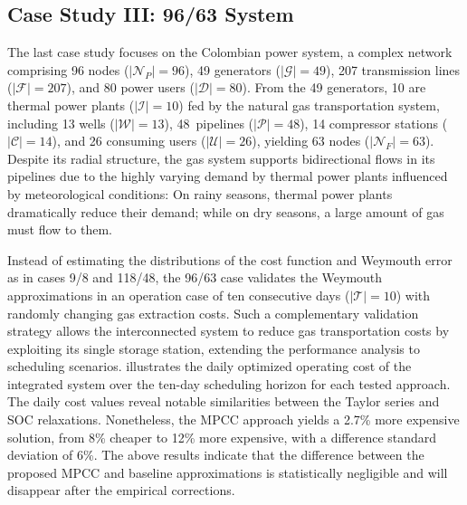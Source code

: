 \subsection{Case Study III: 96/63 System}

The last case study focuses on the Colombian power system, a complex network comprising 96 nodes ($\left | \mathcal{N}_P \right | = 96 $), 49 generators ($\left | \mathcal{G} \right | = 49 $), 207 transmission lines ($\left | \mathcal{F} \right | = 207 $), and 80 power users ($\left | \mathcal{D} \right | = 80 $). From the 49 generators, 10 are thermal power plants ($\left | \mathcal{I} \right | = 10 $) fed by the natural gas transportation system, including 13 wells ($\left | \mathcal{W} \right | = 13 $), \mbox{48 pipelines} ($\left | \mathcal{P} \right | = 48 $), 14 compressor stations ($\left | \mathcal{C} \right | = 14 $), and 26 consuming users (\mbox{$\left | \mathcal{U} \right | = 26 $}), yielding 63 nodes ($\left | \mathcal{N}_{F} \right | = 63 $). Despite its radial structure, the gas system supports bidirectional flows in its pipelines due to the highly varying demand by thermal power plants influenced by meteorological conditions: On rainy seasons, thermal power plants dramatically reduce their demand; while on dry seasons, a large amount of gas must flow to them. 


Instead of estimating the distributions of the cost function and Weymouth error as in cases 9/8 and 118/48, the 96/63 case validates the Weymouth approximations in an operation case of ten consecutive days ($\left | \mathcal{T} \right | = 10 $) with randomly changing gas extraction costs. Such a complementary validation strategy allows the interconnected system to reduce gas transportation costs by exploiting its single storage station, extending the performance analysis to scheduling scenarios.
 illustrates the daily optimized operating cost of the integrated system over the ten-day scheduling horizon for each tested approach. The daily cost values reveal notable similarities between the Taylor series and SOC relaxations. Nonetheless, the MPCC approach yields a 2.7\% more expensive solution, from 8\% cheaper to 12\% more expensive, with a difference standard deviation of 6\%. The above results indicate that the difference between the proposed MPCC and baseline approximations is statistically negligible and will disappear after the empirical corrections.

